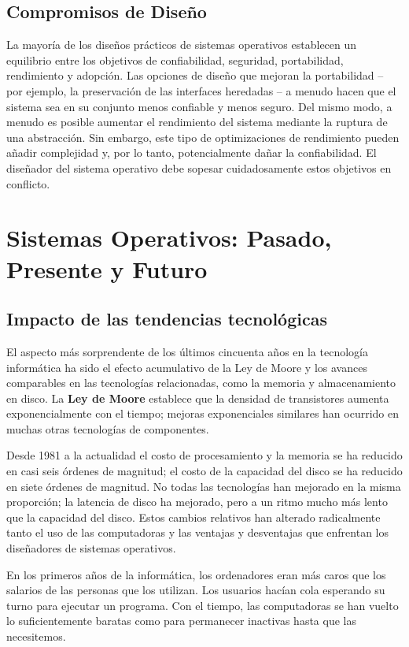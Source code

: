 \documentclass[10pt]{book}
\begin{document}
\subsection{Compromisos de Diseño}
La mayoría de los diseños prácticos de sistemas operativos establecen un equilibrio entre los objetivos de confiabilidad, seguridad, portabilidad, rendimiento y adopción. Las opciones de diseño que mejoran la portabilidad -- por ejemplo, la preservación de las interfaces heredadas -- a menudo hacen que el sistema sea en su conjunto menos confiable y menos seguro. Del mismo modo, a menudo es posible aumentar el rendimiento del sistema mediante la ruptura de una abstracción. Sin embargo, este tipo de optimizaciones de rendimiento pueden añadir complejidad y, por lo tanto, potencialmente dañar la confiabilidad. El diseñador del sistema operativo debe sopesar cuidadosamente estos objetivos en conflicto.


\section{Sistemas Operativos: Pasado, Presente y Futuro}

\subsection{Impacto de las tendencias tecnológicas}
El aspecto más sorprendente de los últimos cincuenta años en la tecnología informática ha sido el efecto acumulativo de la Ley de Moore y los avances comparables en las tecnologías relacionadas, como la memoria y almacenamiento en disco. La \textbf{Ley de Moore} establece que la densidad de transistores aumenta exponencialmente con el tiempo; mejoras exponenciales similares han ocurrido en muchas otras tecnologías de componentes.

Desde 1981 a la actualidad el costo de procesamiento y la memoria se ha reducido en casi seis órdenes de magnitud; el costo de la capacidad del disco se ha reducido en siete órdenes de magnitud. No todas las tecnologías han mejorado en la misma proporción; la latencia de disco ha mejorado, pero a un ritmo mucho más lento que la capacidad del disco. Estos cambios relativos han alterado radicalmente tanto el uso de las computadoras y las ventajas y desventajas que enfrentan los diseñadores de sistemas operativos.

En los primeros años de la informática, los ordenadores eran más caros que los salarios de las personas que los utilizan. Los usuarios hacían cola esperando su turno para ejecutar un programa. Con el tiempo, las computadoras se han vuelto lo suficientemente baratas como para permanecer inactivas hasta que las necesitemos.
\end{document}
